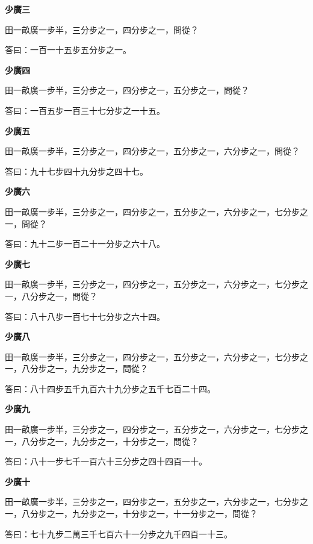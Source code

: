 \documentclass[11pt,a4paper]{article}
\newenvironment{problemenv}[1]{%
  \medskip\noindent\textbf{#1}\par\nopagebreak\smallskip
}{\medskip}
\begin{document}
\begin{problemenv}{少廣三}
田一畝廣一步半，三分步之一，四分步之一，問從？

\textsf{答曰：}一百一十五步五分步之一。
\end{problemenv}

\begin{problemenv}{少廣四}
田一畝廣一步半，三分步之一，四分步之一，五分步之一，問從？

\textsf{答曰：}一百五步一百三十七分步之一十五。
\end{problemenv}

\begin{problemenv}{少廣五}
田一畝廣一步半，三分步之一，四分步之一，五分步之一，六分步之一，問從？

\textsf{答曰：}九十七步四十九分步之四十七。
\end{problemenv}

\begin{problemenv}{少廣六}
田一畝廣一步半，三分步之一，四分步之一，五分步之一，六分步之一，七分步之一，問從？

\textsf{答曰：}九十二步一百二十一分步之六十八。
\end{problemenv}

\begin{problemenv}{少廣七}
田一畝廣一步半，三分步之一，四分步之一，五分步之一，六分步之一，七分步之一，八分步之一，問從？

\textsf{答曰：}八十八步一百七十七分步之六十四。
\end{problemenv}

\begin{problemenv}{少廣八}
田一畝廣一步半，三分步之一，四分步之一，五分步之一，六分步之一，七分步之一，八分步之一，九分步之一，問從？

\textsf{答曰：}八十四步五千九百六十九分步之五千七百二十四。
\end{problemenv}

\begin{problemenv}{少廣九}
田一畝廣一步半，三分步之一，四分步之一，五分步之一，六分步之一，七分步之一，八分步之一，九分步之一，十分步之一，問從？

\textsf{答曰：}八十一步七千一百六十三分步之四十四百一十。
\end{problemenv}

\begin{problemenv}{少廣十}
田一畝廣一步半，三分步之一，四分步之一，五分步之一，六分步之一，七分步之一，八分步之一，九分步之一，十分步之一，十一分步之一，問從？

\textsf{答曰：}七十九步二萬三千七百六十一分步之九千四百一十三。
\end{problemenv}
\end{document}
